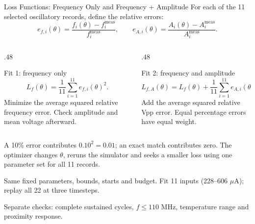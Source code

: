 \begin{frame}{Loss Functions: Frequency Only and Frequency + Amplitude}
\footnotesize
\setlength{\abovedisplayskip}{4pt}
\setlength{\belowdisplayskip}{4pt}
For each of the 11 selected oscillatory records, define the relative errors:
\[
e_{f,i}(\theta)=\frac{f_i(\theta)-f_i^{\mathrm{meas}}}{f_i^{\mathrm{meas}}},
\qquad
e_{A,i}(\theta)=\frac{A_i(\theta)-A_i^{\mathrm{meas}}}{A_i^{\mathrm{meas}}}.
\]
\begin{columns}[T,onlytextwidth]
\begin{column}{.48\textwidth}
\begin{block}{Fit 1: frequency only}
\[
L_f(\theta)=\frac1{11}\sum_{i=1}^{11}e_{f,i}(\theta)^2.
\]
\footnotesize Minimize the average squared relative frequency error. Check amplitude and mean voltage afterward.
\end{block}
\end{column}
\begin{column}{.48\textwidth}
\begin{block}{Fit 2: frequency and amplitude}
\[
L_{f,A}(\theta)=L_f(\theta)+\frac1{11}\sum_{i=1}^{11}e_{A,i}(\theta)^2.
\]
\footnotesize Add the average squared relative Vpp error. Equal percentage errors have equal weight.
\end{block}
\end{column}
\end{columns}
\footnotesize
\par\vspace{0.08cm}
A 10\% error contributes \(0.10^2=0.01\); an exact match contributes zero.
The optimizer changes \(\theta\), reruns the simulator and seeks a smaller loss using one parameter set for all 11 records.
\par\vspace{0.12cm}
Same fixed parameters, bounds, starts and budget. Fit 11 inputs (228--606 \(\mu\)A);
replay all 22 at three timesteps.
\par\vspace{0.08cm}
Separate checks: complete sustained cycles, \(f\leq110\) MHz, temperature range and proximity response.
\end{frame}
